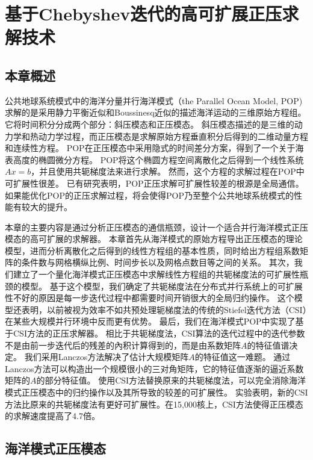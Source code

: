 \chapter{基于Chebyshev迭代的高可扩展正压求解技术}
\label{cha:barosSolver}

\section{本章概述}

公共地球系统模式中的海洋分量并行海洋模式（the Parallel Ocean Model, POP) 求解的是采用静力平衡近似和Boussinesq近似的描述海洋运动的三维原始方程组。 
它将时间积分分成两个部分：斜压模态和正压模态。 
斜压模态描述的是三维的动力学和热动力学过程，而正压模态是求解原始方程垂直积分后得到的二维动量方程和连续性方程。
POP在正压模态中采用隐式的时间差分方案，得到了一个关于海表高度的椭圆微分方程。 
POP将这个椭圆方程空间离散化之后得到一个线性系统$Ax=b$，并且使用共轭梯度法来进行求解。
然而，这个方程的求解过程在POP中可扩展性很差。
已有研究表明，POP正压求解可扩展性较差的根源是全局通信\cite{Worley:2011:PCE:2063384.2063457}。 
如果能优化POP的正压求解过程，将会使得POP乃至整个公共地球系统模式的性能有较大的提升\cite{dennis2012computational}。 


本章的主要内容是通过分析正压模态的通信瓶颈，设计一个适合并行海洋模式正压模态的高可扩展的求解器。 
本章首先从海洋模式的原始方程导出正压模态的理论模型，进而分析离散化之后得到的线性方程组的基本性质，同时给出方程组系数矩阵的条件数与网格横纵比例、时间步长以及网格点数目等之间的关系。 
其次，我们建立了一个量化海洋模式正压模态中求解线性方程组的共轭梯度法的可扩展性瓶颈的模型。
基于这个模型，我们确定了共轭梯度法在分布式并行系统上的可扩展性不好的原因是每一步迭代过程中都需要时间开销很大的全局归约操作。 这个模型还表明，以前被视为效率不如共预处理轭梯度法的传统的Stiefel迭代方法（CSI）在某些大规模并行环境中反而更有优势。
最后，我们在海洋模式POP中实现了基于CSI方法的正压求解器。 相比于共轭梯度法，CSI算法的迭代过程中的迭代参数不是由前一步迭代后的残差的內积计算得到的，而是由系数矩阵$A$的特征值谱决定。 
我们采用Lanczos方法解决了估计大规模矩阵$A$的特征值这一难题。 
通过Lanczos方法可以构造出一个规模很小的三对角矩阵，它的特征值逐渐的逼近系数矩阵的$A$的部分特征值。 
使用CSI方法替换原来的共轭梯度法，可以完全消除海洋模式正压模态中的归约操作以及其所导致的较差的可扩展性。 
实验表明，新的CSI方法比原来的共轭梯度法有更好可扩展性。在15,000核上，CSI方法使得正压模态的求解速度提高了4.7倍。





\section{海洋模式正压模态}
\label{solver:baro}

